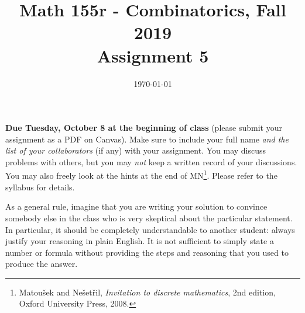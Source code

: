 \documentclass{amsart}
\title[Math 155r, Fall 2019: assignment 5]{Math 155r - Combinatorics, Fall 2019 \\ Assignment 5}
\date{\today}
\theoremstyle{definition}
\begin{document}

\vspace*{-10em}
\maketitle

\textbf{Due Tuesday, October 8 at the beginning of class} (please submit your assignment as a PDF on Canvas). Make sure to include your full name \emph{and the list of your collaborators} (if any) with your assignment. You may discuss problems with others, but you may \emph{not} keep a written record of your discussions. You may also freely look at the hints at the end of MN\footnote{Matoušek and Nešetřil, \emph{Invitation to discrete mathematics}, 2nd edition, Oxford University Press, 2008.}. Please refer to the syllabus for details.

As a general rule, imagine that you are writing your solution to convince somebody else in the class who is very skeptical about the particular statement. In particular, it should be completely understandable to another student: always justify your reasoning in plain English. It is not sufficient to simply state a number or formula without providing the steps and reasoning that you used to produce the answer.
\end{document}
